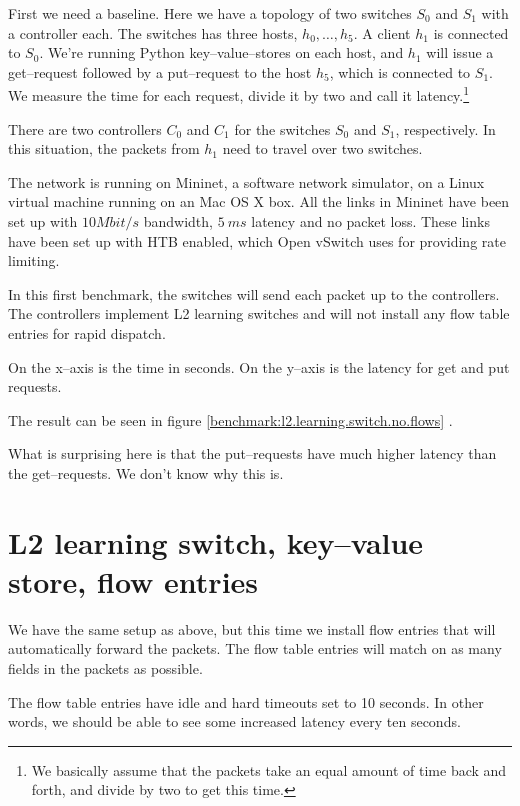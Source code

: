 First we need a baseline.  Here we have a topology of two switches $S_0$ and
$S_1$ with a controller each.  The switches has three hosts, $h_0, \dots, h_5$.
A client $h_1$ is connected to $S_0$. We're running Python
key--value--stores on each host, and $h_1$ will issue a get--request
followed by a put--request to the host $h_5$, which is connected to $S_1$.
We measure the time for each request, divide it
by two and call it latency.\footnote{We basically assume that the packets
take an equal amount of time back and forth, and divide by two to get this
time.}

There are two controllers $C_0$ and $C_1$ for the switches $S_0$ and $S_1$,
respectively.  In this situation, the packets from $h_1$ need to travel
over two switches.

The network is running on Mininet, a software network simulator, on a Linux
virtual machine running on an Mac OS X box.  All the links in Mininet have
been set up with $10 Mbit/s$ bandwidth, $5~ms$ latency and no packet
loss.  These links have been set up with \ac{HTB}
\cite{devera2002hierarchical} enabled, which Open vSwitch
 uses for providing rate limiting.

In this first benchmark, the switches will send each packet up to the
controllers.  The controllers implement L2 learning switches and will not
install any flow table entries for rapid dispatch.

On the x--axis is the time in seconds.  On the y--axis is the latency for
get and put requests.

The result can be seen in figure \ref{benchmark:l2.learning.switch.no.flows} 
.  

What is surprising here is that the put--requests have much higher latency
than the get--requests. We don't know why this is.

\section{L2 learning switch, key--value store, flow entries}

We have the same setup as above, but this time we install flow entries that
will automatically forward the packets.  The flow table entries will match
on as many fields in the packets as possible.

The flow table entries have idle and hard timeouts set to 10 seconds.
In other words, we should be able to see some increased latency every ten
seconds.

